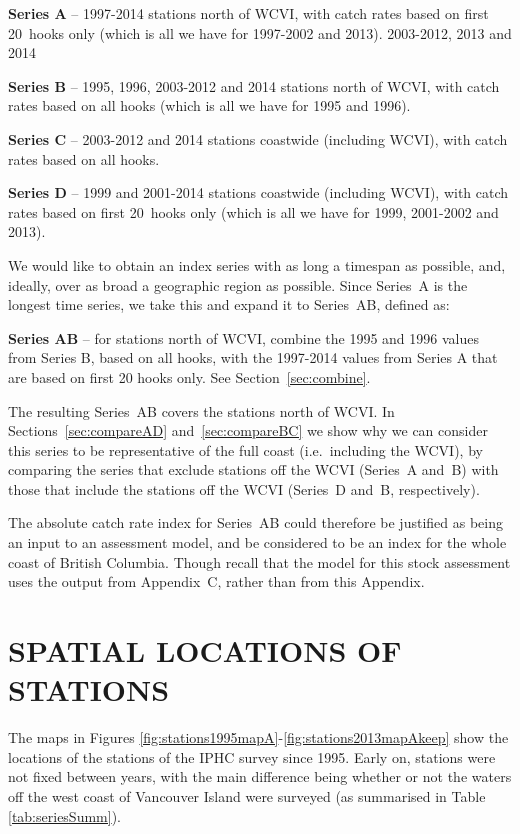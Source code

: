 {\bf Series A} -- 1997-2014 stations north of WCVI, with catch rates based on
first 20~hooks only (which is all we have for 1997-2002 and 2013).  %
2003-2012, 2013 and 2014
 
{\bf Series B} -- 1995, 1996, 2003-2012 and 2014 stations north of WCVI, with
catch rates based on all hooks (which is all we have for 1995 and 1996).

{\bf Series C} -- 2003-2012 and 2014 stations coastwide (including WCVI), with
catch rates based on all hooks.

{\bf Series D} -- 1999 and 2001-2014 stations coastwide (including WCVI), with
catch rates based on first 20~hooks only (which is all we have for 1999,
2001-2002 and 2013).

We would like to obtain an index series with as long a timespan as possible,
and, ideally, over as broad a geographic region as possible. Since Series~A is
the longest time series, we take this and expand it to Series~AB, defined as:

{\bf Series AB} -- for stations north of WCVI, combine the 1995 and 1996 values
from Series B, based on all hooks, with the 1997-2014 values from Series A that
are based on first 20 hooks only. See Section~\ref{sec:combine}.

The resulting Series~AB covers the stations north of WCVI. In
Sections~\ref{sec:compareAD} and~\ref{sec:compareBC} we show why we can consider
this series to be representative of the full coast (i.e.~including the WCVI), by
comparing the series that exclude stations off the WCVI (Series~A and~B) with
those that include the stations off the WCVI (Series~D and~B, respectively).

The absolute catch rate index for Series~AB could therefore be justified as
being an input to an assessment model, and be considered to be an index for the
whole coast of British Columbia. Though recall that the model for this stock
assessment uses the output from Appendix~C, rather than from this Appendix.

\section{SPATIAL LOCATIONS OF STATIONS}

The maps in Figures \ref{fig:stations1995mapA}-\ref{fig:stations2013mapAkeep}
show the locations of the stations of the IPHC survey since 1995. Early on,
stations were not fixed between years, with the main difference being whether or
not the waters off the west coast of Vancouver Island were surveyed (as
summarised in Table \ref{tab:seriesSumm}).

